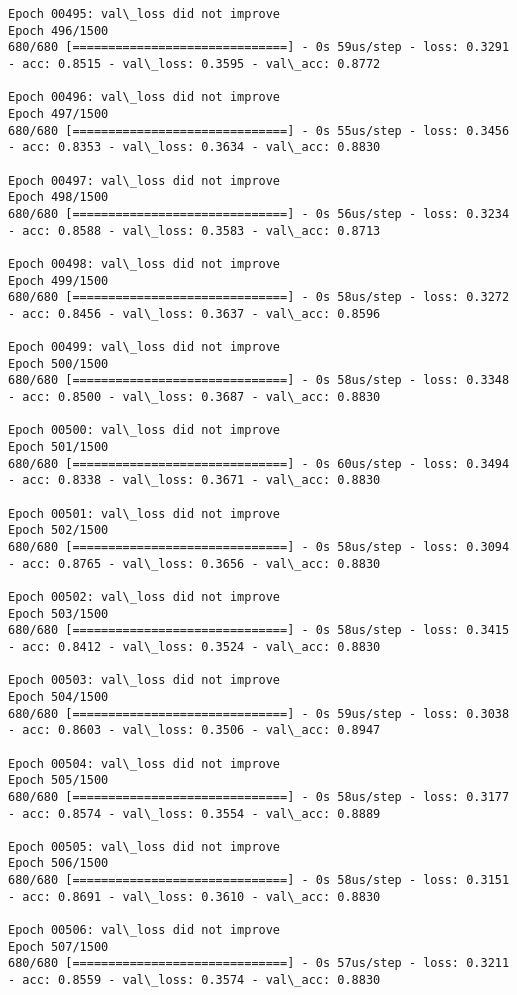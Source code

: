 \documentclass[11pt]{article}
\begin{document}
\begin{Verbatim}[commandchars=\\\{\}]
Epoch 00495: val\_loss did not improve
Epoch 496/1500
680/680 [==============================] - 0s 59us/step - loss: 0.3291 - acc: 0.8515 - val\_loss: 0.3595 - val\_acc: 0.8772

Epoch 00496: val\_loss did not improve
Epoch 497/1500
680/680 [==============================] - 0s 55us/step - loss: 0.3456 - acc: 0.8353 - val\_loss: 0.3634 - val\_acc: 0.8830

Epoch 00497: val\_loss did not improve
Epoch 498/1500
680/680 [==============================] - 0s 56us/step - loss: 0.3234 - acc: 0.8588 - val\_loss: 0.3583 - val\_acc: 0.8713

Epoch 00498: val\_loss did not improve
Epoch 499/1500
680/680 [==============================] - 0s 58us/step - loss: 0.3272 - acc: 0.8456 - val\_loss: 0.3637 - val\_acc: 0.8596

Epoch 00499: val\_loss did not improve
Epoch 500/1500
680/680 [==============================] - 0s 58us/step - loss: 0.3348 - acc: 0.8500 - val\_loss: 0.3687 - val\_acc: 0.8830

Epoch 00500: val\_loss did not improve
Epoch 501/1500
680/680 [==============================] - 0s 60us/step - loss: 0.3494 - acc: 0.8338 - val\_loss: 0.3671 - val\_acc: 0.8830

Epoch 00501: val\_loss did not improve
Epoch 502/1500
680/680 [==============================] - 0s 58us/step - loss: 0.3094 - acc: 0.8765 - val\_loss: 0.3656 - val\_acc: 0.8830

Epoch 00502: val\_loss did not improve
Epoch 503/1500
680/680 [==============================] - 0s 58us/step - loss: 0.3415 - acc: 0.8412 - val\_loss: 0.3524 - val\_acc: 0.8830

Epoch 00503: val\_loss did not improve
Epoch 504/1500
680/680 [==============================] - 0s 59us/step - loss: 0.3038 - acc: 0.8603 - val\_loss: 0.3506 - val\_acc: 0.8947

Epoch 00504: val\_loss did not improve
Epoch 505/1500
680/680 [==============================] - 0s 58us/step - loss: 0.3177 - acc: 0.8574 - val\_loss: 0.3554 - val\_acc: 0.8889

Epoch 00505: val\_loss did not improve
Epoch 506/1500
680/680 [==============================] - 0s 58us/step - loss: 0.3151 - acc: 0.8691 - val\_loss: 0.3610 - val\_acc: 0.8830

Epoch 00506: val\_loss did not improve
Epoch 507/1500
680/680 [==============================] - 0s 57us/step - loss: 0.3211 - acc: 0.8559 - val\_loss: 0.3574 - val\_acc: 0.8830


\end{Verbatim}
\end{document}
